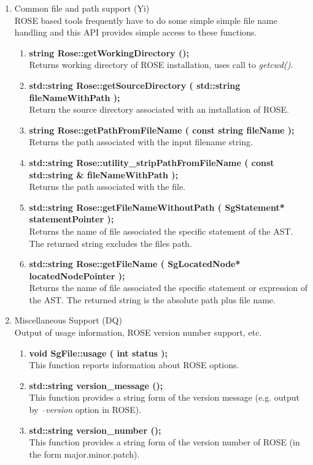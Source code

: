 \begin{enumerate}
   \item Common file and path support (Yi) \\
   ROSE based tools frequently have to do some simple simple file name handling
   and this API provides simple access to these functions.
   \begin{enumerate}
      \item {\bf string Rose::getWorkingDirectory ();} \\
      Returns working directory of ROSE installation, uses call to {\em getcwd()}.

      \item {\bf std::string Rose::getSourceDirectory ( std::string fileNameWithPath );} \\
      Return the source directory associated with an installation of ROSE.

      \item {\bf string Rose::getPathFromFileName ( const string fileName );} \\
      Returns the path associated with the input filename string.

      \item {\bf std::string Rose::utility\_stripPathFromFileName ( const std::string \& fileNameWithPath );} \\
      Returns the path associated with the file.

      \item {\bf std::string Rose::getFileNameWithoutPath ( SgStatement* statementPointer );} \\
      Returns the name of file associated the specific statement of the AST. The returned
      string excludes the files path.

      \item {\bf std::string Rose::getFileName ( SgLocatedNode* locatedNodePointer );} \\
      Returns the name of file associated the specific statement or expression of the AST.
      The returned string is the absolute path plus file name.
   \end{enumerate}

   \item Miscellaneous Support (DQ) \\
         Output of usage information, ROSE version number support, etc.
   \begin{enumerate}
      \item {\bf void SgFile::usage ( int status );} \\
      This function reports information about ROSE options.
      \item {\bf std::string version\_message ();} \\
      This function provides a string form of the version message 
      (e.g. output by {\em --version} option in ROSE).
      \item {\bf std::string version\_number ();} \\
      This function provides a string form of the version number of ROSE
      (in the form major.minor.patch).
   \end{enumerate}


\end{enumerate}
